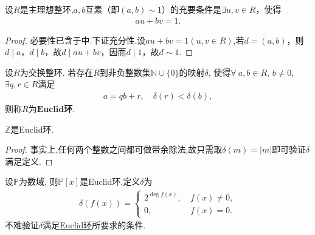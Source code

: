 \documentclass[../../main.tex]{subfiles}%
\begin{document}
\begin{corollary}\label{corollary:主理想整环中互素的充要条件}
设$R$是主理想整环,$a, b$互素（即$(a, b) \sim 1$）的充要条件是$\exists u, v \in R$，使得
\begin{align*}
au + bv = 1. 
\end{align*}
\end{corollary}
\begin{proof}
必要性已含于中.下证充分性.设$au + bv = 1(u,v\in R)$,若$d = (a, b)$，则$d \mid a$，$d \mid b$，故$d \mid au + bv$，因而$d \mid 1$，故$d \sim 1$.
\end{proof}

\begin{definition}[Euclid环]\label{definition:Euclid环的定义}
设$R$为交换整环. 若存在$R$到非负整数集$\mathbb{N}\cup\{0\}$的映射$\delta$, 使得$\forall\ a,b\in R$, $b\neq 0$, $\exists q,r\in R$满足
\begin{align}\label{eq:::09gj3ety4s34wygew3tygwef23g2.5.3}
a=qb+r,\quad \delta(r)<\delta(b),
\end{align}
则称$R$为$\mathbf{Euclid}$\textbf{环}.
\end{definition}

\begin{example}
$\mathbb{Z}$是Euclid环.
\end{example}
\begin{proof}
事实上,任何两个整数之间都可做带余除法,故只需取$\delta(m)=|m|$即可验证$\delta$满足定义.
\end{proof}

\begin{example}
设$\mathbb{P}$为数域, 则$\mathbb{P}[x]$是Euclid环.定义$\delta$为
\begin{align*}
\delta(f(x))=
\begin{cases}
2^{\deg f(x)},\ &f(x)\neq 0,\\
0,\ &f(x)=0.
\end{cases}
\end{align*}
不难验证$\delta$满足\hyperref[definition:Euclid环的定义]{Euclid环}所要求的条件.
\end{example}
\end{document}
